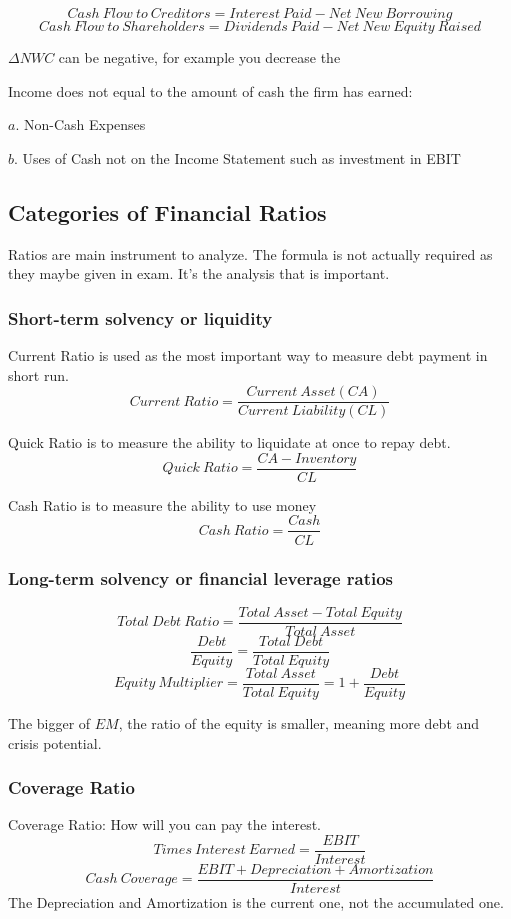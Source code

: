 \documentclass[10pt, a4paper]{article}
\begin{document}
        $$Cash\ Flow\ to\ Creditors = Interest\ Paid - Net\ New\ Borrowing$$
        $$Cash\ Flow\ to\ Shareholders = Dividends\ Paid - Net\ New\ Equity\ Raised$$

        $\Delta NWC$ can be negative, for example you decrease the 


        Income does not equal to the amount of cash the firm has earned:

            $a$. Non-Cash Expenses
        
            $b$. Uses of Cash not on the Income Statement such as investment in EBIT
    
    \subsection{Categories of Financial Ratios}
        Ratios are main instrument to analyze. The formula is not actually required as they maybe given in exam. It's the analysis that is important. 
        
        \subsubsection{Short-term solvency or liquidity}
        Current Ratio is used as the most important way to measure debt payment in short run.
        $$Current\ Ratio = \frac{Current\ Asset(CA)}{Current\ Liability(CL)}$$

        Quick Ratio is to measure the ability to liquidate at once to repay debt.
        $$Quick\ Ratio = \frac{CA - Inventory}{CL}$$
        
        Cash Ratio is to measure the ability to use money 
        $$Cash\ Ratio = \frac{Cash}{CL}$$

        \subsubsection{Long-term  solvency or financial leverage ratios}
        $$Total\ Debt\ Ratio = \frac{Total\ Asset - Total\ Equity}{Total\ Asset}$$
        $$\frac{Debt}{Equity} = \frac{Total\ Debt}{Total\ Equity}$$
        $$Equity\ Multiplier = \frac{Total\ Asset}{Total\ Equity} = 1 + \frac{Debt}{Equity}$$

        The bigger of $EM$, the ratio of the equity is smaller, meaning more debt and crisis potential. 
        \subsubsection{Coverage Ratio}
        Coverage Ratio: How will you can pay the interest. 
        $$Times\ Interest\ Earned = \frac{EBIT}{Interest}$$
        $$Cash\ Coverage = \frac{EBIT + Depreciation + Amortization}{Interest}$$
        The Depreciation and Amortization is the current one, not the accumulated one. 
        
\end{document}
